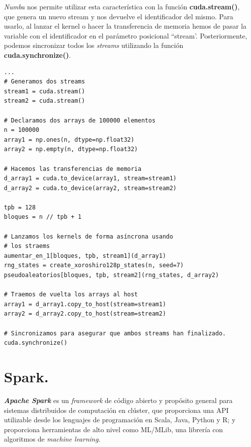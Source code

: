 \textit{Numba} nos permite utilizar esta característica con la función \textbf{cuda.stream()}, que genera un nuevo stream y nos devuelve el identificador del mismo. Para usarlo, al lanzar el kernel o hacer la transferencia de memoria hemos de pasar la variable con el identificador en el parámetro posicional ``stream'. Posteriormente, podemos sincronizar todos los \textit{streams} utilizando la función \textbf{cuda.synchronize()}. \\

\begin{code}
\begin{verbatim}
...
# Generamos dos streams
stream1 = cuda.stream()
stream2 = cuda.stream()

# Declaramos dos arrays de 100000 elementos
n = 100000 
array1 = np.ones(n, dtype=np.float32)
array2 = np.empty(n, dtype=np.float32)

# Hacemos las transferencias de memoria
d_array1 = cuda.to_device(array1, stream=stream1)
d_array2 = cuda.to_device(array2, stream=stream2)

tpb = 128
bloques = n // tpb + 1

# Lanzamos los kernels de forma asíncrona usando
# los straems
aumentar_en_1[bloques, tpb, stream1](d_array1)
rng_states = create_xoroshiro128p_states(n, seed=7)
pseudoaleatorios[bloques, tpb, stream2](rng_states, d_array2)

# Traemos de vuelta los arrays al host
array1 = d_array1.copy_to_host(stream=stream1)
array2 = d_array2.copy_to_host(stream=stream2)

# Sincronizamos para asegurar que ambos streams han finalizado.
cuda.synchronize()
\end{verbatim}
\label{code:streams}
\end{code}

\section{Spark.}



\textbf{\textit{Apache Spark}} es un \textit{framework} de código abierto y propósito general para sistemas distribuidos de computación en clúster, que proporciona una API utilizable desde los lenguajes de programación en Scala, Java, Python y R; y proporciona herramientas de alto nivel como ML/MLib, una librería con algoritmos de \textit{machine learning}. \\

